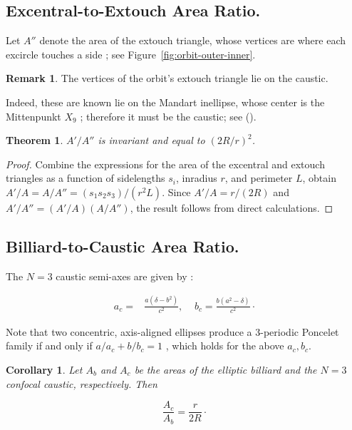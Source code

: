 \documentclass{article}
\newtheorem{theorem}{Theorem}
\newtheorem{corollary}{Corollary}
\theoremstyle{definition}
\newtheorem{remark}{Remark}
\begin{document}
\subsection{Excentral-to-Extouch Area Ratio.}

Let $A''$ denote the area of the extouch triangle, whose vertices are where each excircle touches a side \cite[Extouch Triangle]{mw}; see Figure~\ref{fig:orbit-outer-inner}.

\begin{remark}  
The vertices of the orbit's extouch triangle lie on the caustic.
\end{remark}

Indeed, these are known lie on the Mandart inellipse, whose center is the Mittenpunkt $X_9$ \cite[Mandart Inellipse]{mw}; therefore it must be the caustic; see (\cite[PL\#06]{reznik2020-playlist-proofs}).

\begin{theorem}
$A'/A''$ is invariant and equal to $(2R/r)^2$.
\label{thm:area-ratio-outer-inner}
\end{theorem}

\begin{proof}
Combine the expressions for the area of the excentral \cite[Excentral Triangle]{mw} and extouch triangles \cite[Extouch Triangle]{mw} as a function of sidelengths $s_i$, inradius $r$, and perimeter $L$, obtain $A'/A=A/A''=(s_1 s_2 s_3)/(r^2 L)$. Since $A'/A=r/(2R)$  and $A'/A''=(A'/A)(A/A'')$, the result follows from direct calculations.
\end{proof}

\subsection{Billiard-to-Caustic Area Ratio.}

The $N=3$ caustic semi-axes are given by \cite{garcia2019-ellipses,reznik2020-loci}:

\begin{align}
a_c=&\frac{a\left(\delta-{b}^{2}\right)}{c^2},\;\;\;\;
b_c=\frac{b\left({a}^{2}-\delta\right)}{c^2}\cdot
\end{align}

Note that two concentric, axis-aligned ellipses produce a 3-periodic Poncelet family if and only if $a/a_c+b/b_c=1$ \cite{georgiev2012-poncelet}, which holds for the above $a_c,b_c$. 


\begin{corollary}
\label{cor:caustica_billiard}
Let $A_b$ and $A_c$ be the areas of the elliptic billiard and the $N=3$ confocal caustic, respectively. Then

\begin{equation}
\frac{A_c}{A_b}=\frac{r}{2R}\cdot
\label{eqn:caustic-area-ratio}
\end{equation}
\end{corollary}
\end{document}
